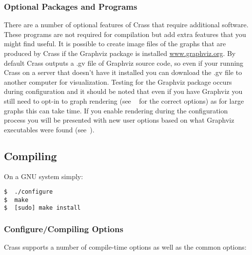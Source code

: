 \documentclass[11pt]{article} %
\begin{document}
\subsubsection{Optional Packages and Programs}
There are a number of optional features of Crass that require additional software.  These programs are not required for compilation but add extra features that you might find useful.  It is possible to create image files of the graphs that are produced by Crass if the Graphviz package is installed \url{www.graphviz.org}.  By default Crass outputs a .gv file of Graphviz source code, so even if your running Crass on a server that doesn't have it installed you can download the .gv file to another computer for visualization.  Testing for the Graphviz package occurs during configuration and it should be noted that even if you have Graphviz you still need to opt-in to graph rendering (see  ~ for the correct options) as for large graphs this can take time.  If you enable rendering during the configuration process you will be presented with new user options based on what Graphviz executables were found (see~).

\subsection{Compiling}
On a GNU system simply:
\begin{lstlisting}[basicstyle=\footnotesize]
$  ./configure
$  make
$  [sudo] make install
\end{lstlisting}

\subsubsection{Configure/Compiling Options}
\label{sec:configure}
Crass supports a number of compile-time options as well as the common options:
\end{document}
